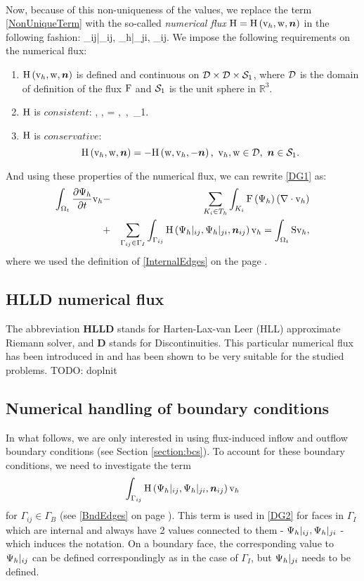\paragraph{}
Now, because of this non-uniqueness of the values, we replace the term \ref{NonUniqueTerm} with the so-called \textit{numerical flux} $\mathrm{H} = \mathrm{H}\left(\mathrm{v}_h, \mathrm{w}, \mbox{\boldmath $n$}\right)$ in the following fashion:
\be
\label{NumFluxDef}
\lo\mrF{}\ro \cdot \bfn_{ij}\ro \mrvh \approx \mrH{}|_{ij}, {\mrPsi_h}|_{ji}, \bfn_{ij}\ro \mrvh.
\ee
We impose the following requirements on the numerical flux:
\begin{enumerate}
 \item $\mathrm{H}\left( \mathrm{v}_h, \mathrm{w}, \mbox{\boldmath $n$}\right)$ is defined and continuous on $\mathcal{D} \times \mathcal{D} \times \mathcal{S}_1$, where $\mathcal{D}$ is the domain of definition of the flux $\mathrm{F}$ and $\mathcal{S}_1$ is the unit sphere in $\mathbb{R}^3$.
 \item $\mathrm{H}$ is $consistent$:
\be
\label{FluxConsistent} \mrH\lo \mrvh, \mrvh, \bfn\ro = \mrF\lo \mrvh\ro \bfn,\ \mrvh\in{},\ \bfn\in{}_1.
 \ee
 \item $\mathrm{H}$ is $conservative$:
 $$
 \mrH\lo \mrvh, \mrw, \bfn\ro = -\mrH\lo \mrw, \mrvh, -\bfn\ro,\ \mrvh, \mrw\in\mc{D},\ \bfn\in\mc{S}_1.
 $$
 \end{enumerate}
And using these properties of the numerical flux, we can rewrite \ref{DG1} as:
\begin{eqnarray}
\label{DG2} \int_{\Omega_{t}} \frac{\partial{{\mathrm{\Psi}_h}}}{\partial{t}} \mathrm{v}_h & - & \sum_{K_i \in T_h}\int_{K_i}\mathrm{F}\left({\mathrm{\Psi}_h}\right) \left(\nabla \cdot \mathrm{v}_h\right)\\ \nonumber & + & \sum_{\Gamma_{ij}\in\Gamma_I} \int_{\Gamma_{ij}} \mathrm{H}\left({\mathrm{\Psi}_h}|_{ij}, {\mathrm{\Psi}_h}|_{ji}, \mbox{\boldmath $n$}_{ij}\right) \mathrm{v}_h = \int_{\Omega_{t}} \mathrm{S} \mathrm{v}_h,
\end{eqnarray}
where we used the definition of \ref{InternalEdges} on the page \pageref{InternalEdges}.
\subsection{HLLD numerical flux}
The abbreviation \textbf{HLLD} stands for Harten-Lax-van Leer (HLL) approximate Riemann solver, and \textbf{D} stands for Discontinuities.
This particular numerical flux has been introduced in \cite{hlld} and has been shown to be very suitable for the studied problems.
TODO: doplnit
\subsection{Numerical handling of boundary conditions}
In what follows, we are only interested in using flux-induced inflow and outflow boundary conditions (see Section \ref{section:bcs}).
To account for these boundary conditions, we need to investigate the term
$$
\int_{\Gamma_{ij}} \mathrm{H}\left({\mathrm{\Psi}_h}|_{ij}, {\mathrm{\Psi}_h}|_{ji}, \mbox{\boldmath $n$}_{ij}\right) \mathrm{v}_h
$$
for $\Gamma_{ij} \in \Gamma_B$ (see \ref{BndEdges} on page \pageref{BndEdges}).
This term is used in \ref{DG2} for faces in $\Gamma_I$ which are internal and always have 2 values connected to them - $\mathrm{\Psi}_h|_{ij}, {\mathrm{\Psi}_h}|_{ji}$ - which induces the notation. On a boundary face, the corresponding value to ${\mathrm{\Psi}_h}|_{ij}$ can be defined correspondingly as in the case of $\Gamma_I$, but ${\mathrm{\Psi}_h}|_{ji}$ needs to be defined.
